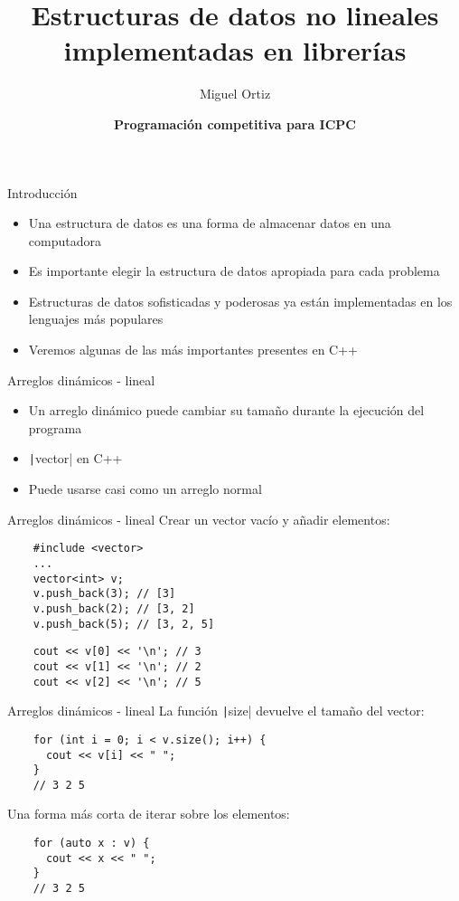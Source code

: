 \documentclass[10pt]{beamer}
\title{Estructuras de datos no lineales implementadas en librerías}
\author{Miguel Ortiz}
\institute{Octubre 2023}
\date{\textbf{Programación competitiva para ICPC}}
\newcommand{\bi}{\begin{itemize}}
\newcommand{\ei}{\end{itemize}}
\begin{document}
\maketitle

\begin{frame}{Introducción}
    \bi
        \item Una estructura de datos es una forma de almacenar datos en una computadora
        \item Es importante elegir la estructura de datos apropiada para cada problema
        \item Estructuras de datos sofisticadas y poderosas ya están implementadas en los lenguajes más populares
        \item Veremos algunas de las más importantes presentes en C++
    \ei
\end{frame}

\begin{frame}[fragile]{Arreglos dinámicos - lineal}
  \bi
    \item Un arreglo dinámico puede cambiar su tamaño durante la ejecución del programa
    \item \texttt|vector| en C++
    \item Puede usarse casi como un arreglo normal
  \ei
\end{frame}

\begin{frame}[fragile]{Arreglos dinámicos - lineal}
  Crear un vector vacío y añadir elementos:
  \begin{verbatim}
    #include <vector>
    ...
    vector<int> v;
    v.push_back(3); // [3]
    v.push_back(2); // [3, 2]
    v.push_back(5); // [3, 2, 5]
  \end{verbatim}
  \begin{verbatim}
    cout << v[0] << '\n'; // 3
    cout << v[1] << '\n'; // 2
    cout << v[2] << '\n'; // 5
  \end{verbatim}
\end{frame}

\begin{frame}[fragile]{Arreglos dinámicos - lineal}
  La función \texttt|size| devuelve el tamaño del vector:
  \begin{verbatim}
    for (int i = 0; i < v.size(); i++) {
      cout << v[i] << " ";
    }
    // 3 2 5
  \end{verbatim}
  Una forma más corta de iterar sobre los elementos:
  \begin{verbatim}
    for (auto x : v) {
      cout << x << " ";
    }
    // 3 2 5
  \end{verbatim}
\end{frame}
\end{document}
